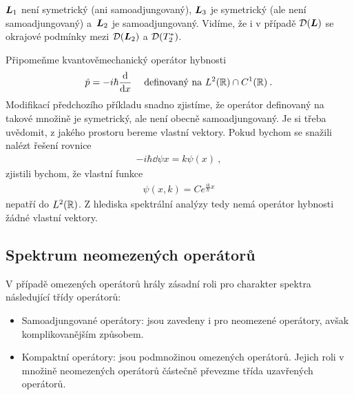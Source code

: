 { $\boldsymbol{L}_1$ není symetrický (ani samoadjungovaný), $\boldsymbol{L}_3$ je symetrický (ale není samoadjungovaný) a~$\boldsymbol{L}_2$ je samoadjungovaný. Vidíme, že i v případě $\mathcal{D}(\boldsymbol{L})$ se okrajové podmínky  mezi $\mathcal{D}(\boldsymbol{L}_2)$ a $\mathcal{D}(T_2^*)$.
}


\begin{remark}
Připomeňme kvantověmechanický operátor hybnosti \begin{align*}
    \hat p = -i \hbar \frac{\mathrm{d} }{\mathrm{d} x} \; \quad \text{definovaný na } L^2(\mathbb{R}) \cap C^1(\mathbb{R}) \:.
\end{align*}
Modifikací předchozího příkladu snadno zjistíme, že operátor definovaný na takové množině je symetrický, ale není obecně samoadjungovaný. Je si třeba uvědomit, z jakého prostoru bereme vlastní vektory. Pokud bychom se snažili nalézt řešení rovnice \begin{align*}
    -i \hbar \dd{\psi}{x} = k \psi(x) \:,
\end{align*}
zjistili bychom, že vlastní funkce \begin{align*}
    \psi(x, k) = C e^{\frac{ik}{\hbar} x}
\end{align*}
nepatří do $L^2(\mathbb{R})$. Z hlediska spektrální analýzy tedy nemá operátor hybnosti žádné vlastní vektory.
\end{remark}



\subsection{Spektrum neomezených operátorů}

V případě omezených operátorů hrály zásadní roli pro charakter spektra následující třídy operátorů: \begin{itemize}
    \item Samoadjungované operátory: jsou zavedeny i pro neomezené operátory, avšak komplikovanějším způsobem.
    \item Kompaktní operátory: jsou podmnožinou omezených operátorů. Jejich roli v množině neomezených operátorů částečně převezme třída uzavřených operátorů.
\end{itemize}

